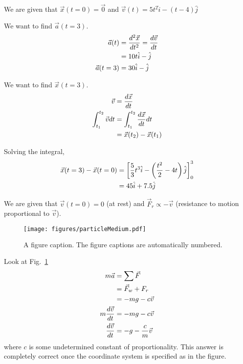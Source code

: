 \begin{subquestions}
\subquestion We are given that $\vec{x}(t=0) = \vec{0}$ and $\vec{v}(t) = 5t^2 \hat{i} - (t-4)\hat{j}$
\item We want to find $\vec{a}(t=3)$.
\begin{align}
   \vec{a}(t) & = \frac{d^2 \vec{x}}{dt^2} = \frac{d\vec{v}}{dt} \nonumber \\
   &= 10 t \hat{i}  - \hat{j}  \nonumber \\
   \vec{a} (t=3) &= 30 \hat{i} - \hat{j}
\end{align}

\item We want to find $\vec{x}(t=3)$.
\begin{align}
   \vec{v} &= \frac{d\vec{x}}{dt} \nonumber \\
   \int_{t_1}^{t_2} \vec{v} dt &=  \int_{t_1}^{t_2} \frac{d\vec{x}}{dt}  dt\nonumber \\
         &=\vec{x}(t_2) - \vec{x}(t_1)
\end{align}

Solving the integral, 
\begin{align}
   \vec{x}(t=3) - \vec{x}(t=0) &= \left[ \frac{5}{3}t^3 \hat{i} - \left(\frac{t^2}{2} - 4t\right)\hat{j}\right]^{3}_0 \nonumber \\
   &= 45 \hat{i} + 7.5 \hat{j}
\end{align}


\subquestion We are given that $\vec{v}(t=0) = 0$ (at rest) and $\vec{F}_r \propto -\vec{v}$ (resistance to motion proportional to $\vec{v}$). 


\begin{figure}
\begin{center}
\texttt{[image: figures/particleMedium.pdf]}
\caption{\label{2015:q5:fig:particle1} A figure caption. The figure captions are
automatically numbered.}
\end{center}
\end{figure}

Look at Fig.~\ref{2015:q5:fig:particle1}
\begin{align}
   m \vec{a} &= \sum \vec{F} \nonumber\\
    &= \vec{F}_w + F_r \nonumber \\
   &= -m g - c \vec{v} \nonumber \\
   m \frac{d\vec{v}}{dt} &= -mg - c \vec{v} \nonumber \\
    \frac{d\vec{v}}{dt} &= -g - \frac{c}{m} \vec{v}
\end{align}
where $c$ is some undetermined constant of proportionality. This answer is completely correct once the coordinate system is specified as in the figure.


\end{subquestions}
